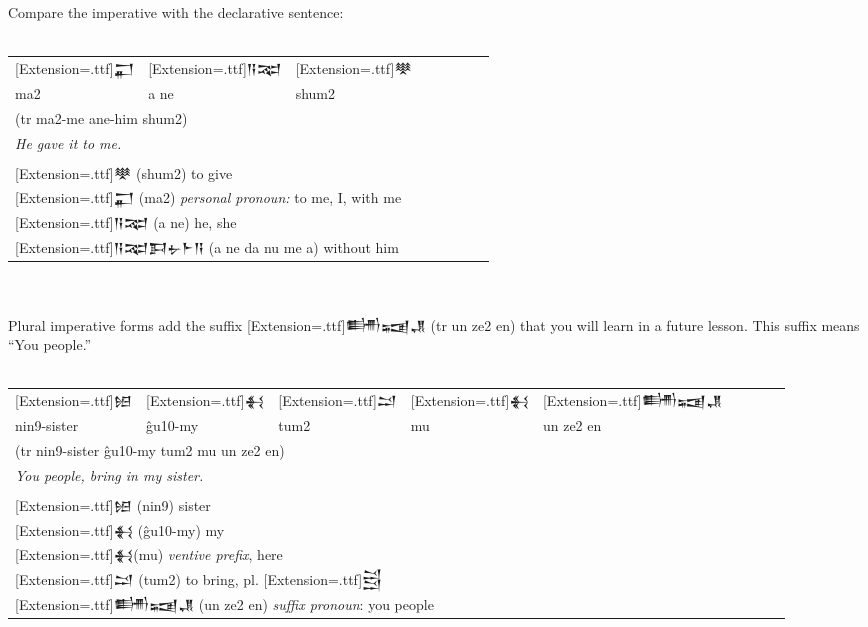 \documentclass[a4paper,12pt]{book}
\newcommand{\fcn}{\setmainfont{Akkadian}[Extension=.ttf]}
\newcommand{\fcm}{\large\setmainfont{Akkadian}[Extension=.ttf]}
\newcommand{\fsm}{\Large\setmainfont{Akkadian}[Extension=.ttf]}
\begin{document}
\newpage
\noindent
Compare the imperative with the declarative sentence:\\

\verb||\\
\begin{tabular}[!h]{l l l l l l l l}
  \fsm 𒂷 &\fsm 𒀀𒉈 &\fsm 𒋧\\
  ma2 & a ne & shum2\\
  \multicolumn{3}{l}{(tr ma2-me ane-him shum2)}\\
  \multicolumn{3}{l}{\em He gave it to me.}\\
  \hline\\
  \multicolumn{3}{l}{{\fcm 𒋧} (shum2) to give }\\
  \multicolumn{3}{l}{{\fcm 𒂷} (ma2)
    {\em personal pronoun:} to me, I, with me }\\
  \multicolumn{3}{l}{{\fcm 𒀀𒉈} (a ne) he, she }\\
  \multicolumn{3}{l}{{\fcm 𒀀𒉈𒁕𒉡𒈨𒀀} (a ne da nu me a) without him }\\
\end{tabular}\verb||\\

\verb||\\
Plural imperative forms add the
suffix {\fcn 𒌦𒍢𒂗} (tr un ze2 en) that
you will learn in a future lesson. This suffix
means ``You people.''\\

\verb||\\
\begin{tabular}[!h]{l l l l l l l l l}
  \fsm 𒎐 &\fsm 𒈬 &\fsm 𒁺 &\fsm 𒈬 &\fsm 𒌦𒍢𒂗\\
  nin9-sister & ĝu10-my & tum2 & mu & un ze2 en\\
  \multicolumn{5}{l}{(tr nin9-sister ĝu10-my tum2 mu un ze2 en)}\\
  \multicolumn{5}{l}{\em You people, bring in my sister.}\\
  \hline\\
  \multicolumn{5}{l}{ {\fcm 𒎐} (nin9) sister }\\
  \multicolumn{5}{l}{{\fcm 𒈬} (ĝu10-my) my}\\
  \multicolumn{5}{l}{{\fcm 𒈬}(mu) {\em ventive prefix}, here }\\
  \multicolumn{5}{l}{{\fcm 𒁺} (tum2) to bring,
    pl. {\fcn 𒁻}}\\
  \multicolumn{5}{l}{{\fcm 𒌦𒍢𒂗} (un ze2 en)
    {\em suffix pronoun}: you people }\\
\end{tabular}
\end{document}
